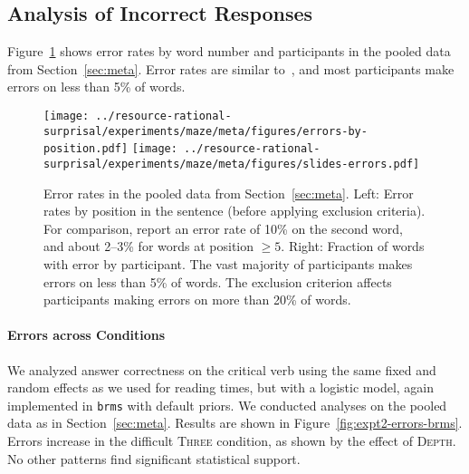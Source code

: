 \subsection{Analysis of Incorrect Responses}
Figure~\ref{fig:expt2-errors} shows error rates by word number and participants in the pooled data from Section~\ref{sec:meta}.
Error rates are similar to~\citet{boyce2020maze}, and most participants make errors on less than 5\% of words.



\begin{figure}
    \centering
    
    \texttt{[image: ../resource-rational-surprisal/experiments/maze/meta/figures/errors-by-position.pdf]}
     \texttt{[image: ../resource-rational-surprisal/experiments/maze/meta/figures/slides-errors.pdf]}
   
	\caption{Error rates in the pooled data from Section~\ref{sec:meta}. Left: Error rates by position in the sentence (before applying exclusion criteria). For comparison, \citet{boyce2020maze} report an error rate of 10\% on the second word, and about 2--3\% for words at position $\geq 5$. Right: Fraction of words with error by participant. The vast majority of participants makes errors on less than 5\% of words. The exclusion criterion affects participants making errors on more than 20\% of words.}
    \label{fig:expt2-errors}
\end{figure}



\paragraph{Errors across Conditions}
We analyzed answer correctness on the critical verb using the same fixed and random effects as we used for reading times, but with a logistic model, again implemented in \texttt{brms} with default priors.
We conducted analyses on the pooled data as in Section~\ref{sec:meta}.
Results are shown in Figure~\ref{fig:expt2-errors-brms}.
Errors increase in the difficult \textsc{Three} condition, as shown by the effect of \textsc{Depth}. No other patterns find significant statistical support.

